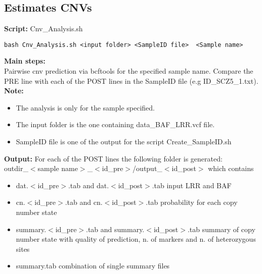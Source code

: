 \documentclass[11pt]{paper}
\begin{document}
\subsection{Estimates CNVs}
\textbf{Script:} Cnv\_Analysis.sh
\begin{verbatim}
bash Cnv_Analysis.sh <input folder> <SampleID file>  <Sample name> 
\end{verbatim}
\textbf{Main steps:}\\
Pairwise cnv prediction via bcftools for the specified sample name. Compare the PRE line with each of the POST lines in the SampleID file (e.g ID\_SCZ5\_1.txt).\\
\textbf{Note:}
\vspace{-0.2cm}
\begin{itemize}
\item The analysis is only for the sample specified.
\item The input folder is the one containing data\_BAF\_LRR.vcf file.
\item SampleID file is one of the output for the script Create\_SampleID.sh
\end{itemize}
\textbf{Output:}
For each of the POST lines the following folder is generated:\\
outdir\_$<$sample name$>$\_$<$id\_pre$>$/output\_$<$id\_post$>$ which contains
\begin{itemize}
\item dat.$<$id\_pre$>$.tab and dat.$<$id\_post$>$.tab input LRR and BAF
\item cn.$<$id\_pre$>$.tab and cn.$<$id\_post$>$.tab probability for each copy number state
\item summary.$<$id\_pre$>$.tab and summary.$<$id\_post$>$.tab summary of copy number state with quality of prediction, n. of markers and n. of heterozygous sites
\item summary.tab combination of single summary files 
\end{itemize}
\end{document}
